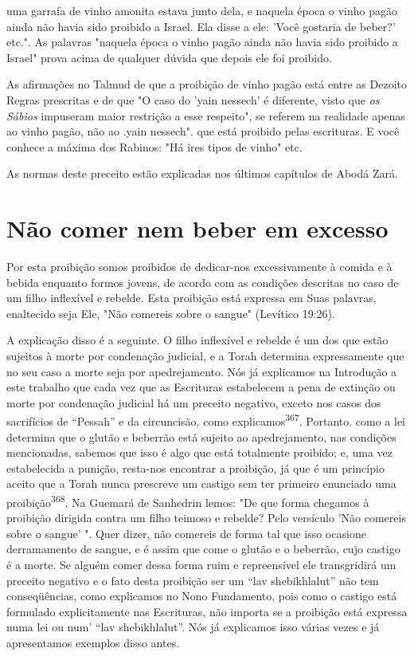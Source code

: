 uma garrafa de vinho amonita estava junto dela, e naquela época o vinho
pagão ainda não havia sido proibido a Israel. Ela disse a ele: 'Você
gostaria de beber?' etc.". As palavras "naquela época o vinho pagão
ainda não havia sido proibido a Israel" prova acima de qualquer dúvida
que depois ele foi proibido.

As afirmações no Talmud de que a proibição de vinho pagão está entre as
Dezoito Regras prescritas e de que "O caso do 'yain nessech' é
diferen­te, visto que \emph{os Sábios} impuseram maior restrição a esse
respeito", se referem na realidade apenas ao vinho pagão, não ao
.yain nessech". que está proibido pelas escrituras. E
você conhece a máxima dos Rabinos: "Há ires tipos de vi­nho" etc.

As normas deste preceito estão explicadas nos últimos capítulos de Abodá
Zará.

\section{Não comer nem beber em excesso}

Por esta proibição somos proibidos de dedicar-nos excessivamente à
comida e à bebida enquanto formos jovens, de acordo com as condições
des­critas no caso de um filho inflexível e rebelde. Esta proibição está
expressa em Suas palavras, enaltecido seja Ele, "Não comereis sobre o
sangue" (Levítico 19:26).

A explicação disso é a seguinte. O filho inflexível e rebelde é um dos
que estão sujeitos à morte por condenação judicial, e a Torah determina
ex­pressamente que no seu caso a morte seja por
apedrejamento. Nós já expli­camos na Introdução a este
trabalho que cada vez que as Escrituras estabele­cem a pena de extinção
ou morte por condenação judicial há um preceito ne­gativo, exceto nos
casos dos sacrifícios de ``Pessah'' e da circuncisão, como
explicamos\textsuperscript{367}. Portanto. como a lei determina que o
glutão e beberrão está su­jeito ao apedrejamento, nas condições
mencionadas, sabemos que isso é algo que está totalmente proibido; e,
uma vez estabelecida a punição, resta-nos en­contrar a proibição, já que
é um princípio aceito que a Torah nunca prescreve um castigo sem ter
primeiro enunciado uma proibição\textsuperscript{368}. Na Guemará de
Sa­nhedrin lemos: "De que forma chegamos à proibição dirigida contra um
filho teimoso e rebelde? Pelo versículo 'Não comereis sobre o sangue' ".
Quer di­zer, não comereis de forma tal que isso ocasione derramamento de
sangue, e é assim que come o glutão e o beberrão, cujo castigo é a
morte. Se alguém co­mer dessa forma ruim e repreensível ele transgridirá
um preceito negativo e o fato desta proibição ser um ``lav shebikhlalut''
não tem conseqüências, como explicamos no Nono Fundamento, pois como o
castigo está formulado explici­tamente nas Escrituras, não importa se a
proibição está expressa numa lei ou num' ``lav shebikhlalut''. Nós já
explicamos isso várias vezes e já apresentamos exemplos disso antes.


